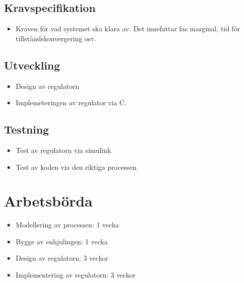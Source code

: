 \documentclass[a4paper]{article}
\begin{document}
    \subsection*{Kravspecifikation}

    \begin{itemize}
    \item [] Kraven för vad systemet ska klara av. Det innefattar fas marginal, tid för tillståndskonvergering osv.
    \end{itemize}
    
    \subsection*{Utveckling}
    
    \begin{itemize}
    \item [] Design av regulatorn
    \item [] Implemeteringen av regulator via C.
    \end{itemize}
    
    \subsection*{Testning}
    
    \begin{itemize}
    \item [] Test av regulatorn via simulink
    \item [] Test av koden via den riktiga processen.
    \end{itemize}
    
    
\section{Arbetsbörda}

\begin{itemize}
\item[] Modellering av processen: 1 vecka

\item[] Bygge av enhjulingen: 1 vecka

\item[] Design av regulatorn: 3 veckor

\item[] Implementering av regulatorn: 3 veckor
\end{itemize}
\end{document}
